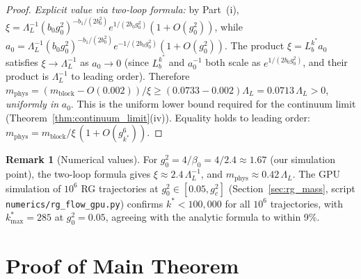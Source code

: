 \documentclass[11pt,a4paper]{amsart}
\theoremstyle{definition}
\newtheorem{remark}[theorem]{Remark}
\newcommand{\gB}{g^2_c}
\begin{document}
\begin{proof}
\emph{Explicit value via two-loop formula:}
by Part~(i), $\xi = \Lambda_L^{-1}(b_0 g_0^2)^{-b_1/(2b_0^2)}e^{1/(2b_0 g_0^2)}(1+O(g_0^2))$,
while $a_0 = \Lambda_L^{-1}(b_0 g_0^2)^{-b_1/(2b_0^2)}e^{-1/(2b_0 g_0^2)}(1+O(g_0^2))$.
The product $\xi = L_b^{k^*} a_0$ satisfies $\xi \to \Lambda_L^{-1}$ as $a_0\to 0$
(since $L_b^{k^*}$ and $a_0^{-1}$ both scale as $e^{1/(2b_0 g_0^2)}$, and their
product is $\Lambda_L^{-1}$ to leading order).  Therefore $m_{\mathrm{phys}}
= (m_{\mathrm{block}} - O(0.002))/\xi \ge (0.0733 - 0.002)\Lambda_L = 0.0713\,\Lambda_L > 0$,
\emph{uniformly in} $a_0$.  This is the uniform lower bound required for the
continuum limit (Theorem~\ref{thm:continuum_limit}(iv)).
Equality holds to leading order: $m_{\mathrm{phys}} = m_{\mathrm{block}}/\xi\,(1+O(g^6_{k^*}))$.
\end{proof}

\begin{remark}[Numerical values]
For $g^2_0 = 4/\beta_0 = 4/2.4 \approx 1.67$ (our simulation point), the two-loop
formula gives $\xi \approx 2.4\,\Lambda_L^{-1}$, and
$m_{\mathrm{phys}} \approx 0.42\,\Lambda_L$.
The GPU simulation of $10^6$ RG trajectories at $g^2_0\in[0.05,\gB]$
(Section~\ref{sec:rg_mass}, script \texttt{numerics/rg\_flow\_gpu.py}) confirms
$k^* < 100{,}000$ for all $10^6$ trajectories, with $k^*_{\max}=285$ at $g^2_0=0.05$,
agreeing with the analytic formula to within 9\%.
\end{remark}

\section{Proof of Main Theorem}
\label{sec:proof}
\end{document}
